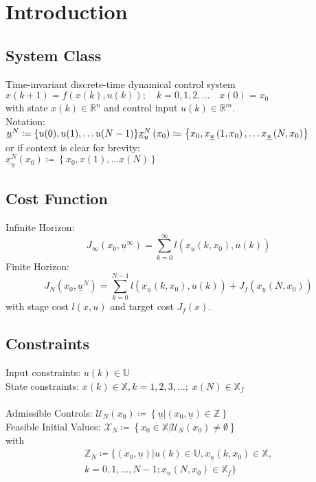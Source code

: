 \documentclass[english]{latex4ei/latex4ei_sheet}
\begin{document}
\section{Introduction}
\begin{sectionbox}

\subsection{System Class}
Time-invariant discrete-time dynamical control system \\
$x(k+1)=f(x(k), u(k));\quad k=0,1,2,...\quad x(0)=x_0$\\
with state $x(k)\in\mathbb{R}^n$ and control input $u(k)\in\mathbb{R}^m$.\\

Notation:\\
${\underline{u}^{N}\coloneqq\{u(0), u(1), \ldots u(N-1)\}} \\ {\underline{x}_{u}^{N}\left(x_{0}\right)\coloneqq\left\{x_{0}, x_{\underline{u}}\left(1, x_{0}\right), \ldots x_{\underline{u}}\left(N, x_{0}\right)\right\}}$ \\ 
or if context is clear for brevity: \\ ${\underline{x}_{\underline{u}}^{N}\left(x_{0}\right)\coloneqq\left\{x_{0}, x(1), \ldots x(N)\right\}}$\\

\subsection{Cost Function}
Infinite Horizon:
\[J_{\infty}\left(x_{0}, \underline{u}^{\infty}\right)=\sum_{k=0}^{\infty} l\left(x_{\underline{u}}\left(k, x_{0}\right), u(k)\right)\]
Finite Horizon:
\[J_{N}\left(x_{0}, \underline{u}^{N}\right)=\sum_{k=0}^{N-1} l\left(x_{\underline{u}}\left(k, x_{0}\right), u(k)\right)+J_{f}\left(x_{\underline{u}}\left(N, x_{0}\right)\right)\]
with stage cost $l(x,u)$ and target cost $J_f(x)$.\\

\subsection{Constraints}
Input constraints: $u(k) \in \mathbb{U}$ \\ 
State constraints: $x(k) \in \mathbb{X}, k=1,2,3, \ldots ;\; x(N) \in \mathbb{X}_{f}$ \\ \\
Admissible Controls:  $\mathcal{U}_{N}\left(x_{0}\right)\coloneqq\left\{\underline{u} |\left(x_{0}, \underline{u}\right) \in \mathbb{Z}\right\}$ \\ Feasible Initial Values: $\mathcal{X}_{N}\coloneqq\left\{x_{0} \in \mathbb{X} | \mathcal{U}_{N}\left(x_{0}\right) \neq \emptyset\right\}$\\
with 
\begin{multline*}
\mathbb{Z}_{N}\coloneqq\Big\{\left(x_{0}, \underline{u}\right) | u(k) \in \mathbb{U}, x_{\underline{u}}\left(k, x_{0}\right) \in \mathbb{X}, \\ k=0,1, \ldots, N-1 ; x_{\underline{u}}\left(N, x_{0}\right) \in \mathbb{X}_{f}\Big\}
\end{multline*}


\end{sectionbox}
\end{document}
